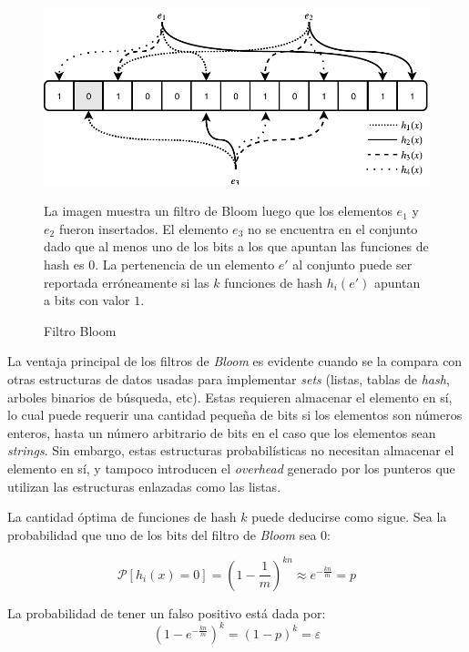 \documentclass[a4paper,10pt, oneside]{article}
\begin{document}
\begin{figure}[ht]
	\centering
	\includegraphics[width=1\textwidth]{./graph/bloom.pdf}
	\caption{Filtro Bloom}
	\label{fig:bloom}
	\medskip
	\small
	
	\parbox{13.1cm}{La imagen muestra un filtro de Bloom luego que los elementos $e_1$ y $e_2$ fueron insertados. El elemento $e_3$ no se encuentra en el conjunto dado que al menos uno de los bits a los que apuntan las funciones de hash es $0$. La pertenencia de un elemento $e'$ al conjunto puede ser reportada erróneamente si las $k$ funciones de hash $h_i(e')$ apuntan a bits con valor $1$.}
	
\end{figure}

La ventaja principal de los filtros de \textit{Bloom} es evidente cuando se la compara con otras estructuras de datos usadas para implementar \textit{sets} (listas, tablas de \textit{hash}, arboles binarios de búsqueda, etc). Estas requieren almacenar el elemento en sí, lo cual puede requerir una cantidad pequeña de bits si los elementos son números enteros, hasta un número arbitrario de bits en el caso que los elementos sean \textit{strings}. Sin embargo, estas estructuras probabilísticas no necesitan almacenar el elemento en sí, y tampoco introducen el \textit{overhead} generado por los punteros que utilizan las estructuras enlazadas como las listas.

La cantidad óptima de funciones de hash $k$ puede deducirse como sigue. Sea la probabilidad que uno de los bits del filtro de \textit{Bloom} sea 0:

\begin{equation}
	\mathcal{P} [h_i(x)=0 ] = (1- \frac{1}{m})^{kn} \approx e ^ {-\frac{kn}{m}} = p
\end{equation}

La probabilidad de tener un falso positivo está dada por:
\begin{equation}
	(1 - e ^ {-\frac{kn}{m}})^k = (1 - p)^k = \varepsilon
\end{equation}
\end{document}
